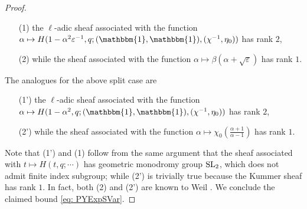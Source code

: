 \documentclass[A4]{amsart}
\makeatletter
\numberwithin{equation}{section} \everymath{\displaystyle}
\newcommand{\SL}{{\rm SL}}
\newcommand{\id}{\mathbbm{1}}
\newcommand{\Rmnum}[1]{\expandafter\@slowromancap\romannumeral #1@}
\makeatother
\begin{document}
\begin{proof}
\begin{itemize}
	\item[(1)] the $\ell$-adic sheaf associated with the function $\alpha \mapsto H(1-\alpha^2 \varepsilon^{-1},q; (\id, \id), (\chi^{-1},\eta_0))$ has rank $2$, 
	\item[(2)] while the sheaf associated with the function $\alpha \mapsto \beta(\alpha + \sqrt{\varepsilon})$ has rank $1$.
\end{itemize}
	The analogues for the above split case are
\begin{itemize}
	\item[(1')] the $\ell$-adic sheaf associated with the function $\alpha \mapsto H(1-\alpha^2,q; (\id, \id), (\chi^{-1},\eta_0))$ has rank $2$, 
	\item[(2')] while the sheaf associated with the function $\alpha \mapsto \chi_0 \left( \tfrac{\alpha+1}{\alpha-1} \right)$ has rank $1$.
\end{itemize}
	Note that (1') and (1) follow from the same argument that the sheaf associated with $t \mapsto H(t,q; \cdots)$ has geometric monodromy group $\SL_2$, which does not admit finite index subgroup; while (2') is trivially true because the Kummer sheaf has rank $1$. In fact, both (2) and (2') are known to Weil \cite[Appendix \Rmnum{5}]{We74}. We conclude the claimed bound \eqref{eq: PYExpSVar}.
\end{proof}
	
\end{document}
